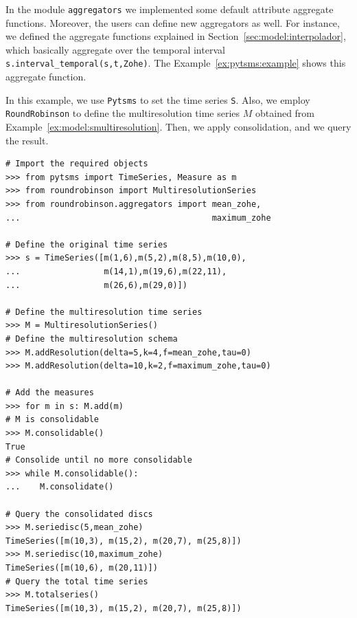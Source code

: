 In the module \texttt{aggregators} we implemented some default
attribute aggregate functions. Moreover, the users can define new
aggregators as well. For instance, we defined the \zohe{} aggregate
functions explained in Section~\ref{sec:model:interpolador}, which
basically aggregate over the temporal interval
\verb|s.interval_temporal(s,t,Zohe)|.  The
Example~\ref{ex:pytsms:example} shows this aggregate function.

\begin{example}
  In this example, we use \texttt{Pytsms} to set the time series
  \texttt{S}. Also, we employ \texttt{RoundRobinson} to define the
  multiresolution time series $M$ obtained from
  Example~\ref{ex:model:smultiresolution}. Then, we apply
  consolidation, and we query the result.

{\small
\begin{verbatim}
# Import the required objects
>>> from pytsms import TimeSeries, Measure as m
>>> from roundrobinson import MultiresolutionSeries
>>> from roundrobinson.aggregators import mean_zohe,
...                                       maximum_zohe

# Define the original time series
>>> s = TimeSeries([m(1,6),m(5,2),m(8,5),m(10,0),
...                 m(14,1),m(19,6),m(22,11),
...                 m(26,6),m(29,0)])

# Define the multiresolution time series
>>> M = MultiresolutionSeries()
# Define the multiresolution schema
>>> M.addResolution(delta=5,k=4,f=mean_zohe,tau=0)
>>> M.addResolution(delta=10,k=2,f=maximum_zohe,tau=0)

# Add the measures
>>> for m in s: M.add(m)
# M is consolidable
>>> M.consolidable()
True
# Consolide until no more consolidable
>>> while M.consolidable():
...    M.consolidate()

# Query the consolidated discs 
>>> M.seriedisc(5,mean_zohe)
TimeSeries([m(10,3), m(15,2), m(20,7), m(25,8)])
>>> M.seriedisc(10,maximum_zohe)
TimeSeries([m(10,6), m(20,11)])
# Query the total time series
>>> M.totalseries()
TimeSeries([m(10,3), m(15,2), m(20,7), m(25,8)])
\end{verbatim}
}
\end{example}






